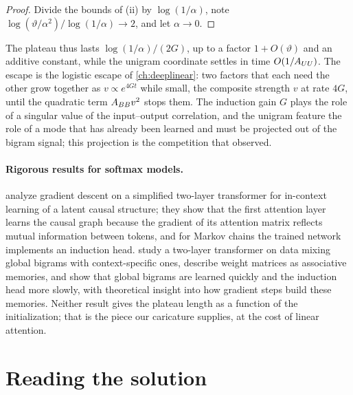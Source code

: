 \begin{refsection}
\begin{proof}
Divide the bounds of (ii) by $\log(1/\alpha)$, note $\log(\vartheta/\alpha^2)/\log(1/\alpha)\to2$, and let $\alpha\to0$.
\end{proof}

The plateau thus lasts $\log(1/\alpha)/(2G)$, up to a factor $1+O(\vartheta)$ and an additive constant, while the unigram coordinate settles in time $O(1/A_{UU})$. The escape is the logistic escape of \cref{ch:deeplinear}: two factors that each need the other grow together as $v\propto e^{4Gt}$ while small, the composite strength $v$ at rate $4G$, until the quadratic term $A_{BB} v^2$ stops them. The induction gain $G$ plays the role of a singular value of the input--output correlation, and the unigram feature the role of a mode that has already been learned and must be projected out of the bigram signal; this projection is the competition that \textcite{EdelmanEtAl2024} observed.

\paragraph{Rigorous results for softmax models.} \Textcite{NichaniEtAl2024} analyze gradient descent on a simplified two-layer transformer for in-context learning of a latent causal structure; they show that the first attention layer learns the causal graph because the gradient of its attention matrix reflects mutual information between tokens, and for Markov chains the trained network implements an induction head. \Textcite{BiettiEtAl2023} study a two-layer transformer on data mixing global bigrams with context-specific ones, describe weight matrices as associative memories, and show that global bigrams are learned quickly and the induction head more slowly, with theoretical insight into how gradient steps build these memories. Neither result gives the plateau length as a function of the initialization; that is the piece our caricature supplies, at the cost of linear attention.

\section{Reading the solution}\label{sec:induction:reading}


\end{refsection}
